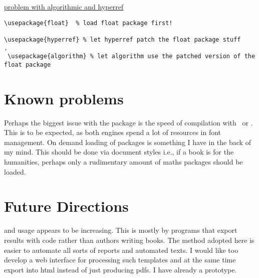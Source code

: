  
 \href{http://tex.stackexchange.com/questions/96350/problem-with-algorithmic-and-hyperref}{problem with algorithmic and hyperref}

 \begin{verbatim}
\usepackage{float}  % load float package first!

\usepackage{hyperref} % let hyperref patch the float package stuff
.
 \usepackage{algorithm} % let algorithm use the patched version of the float package
 \end{verbatim}
 

\section{Known problems}

Perhaps the biggest issue with the package is the speed of
compilation with \XeLaTeX\ or \LuaTeX. This is to be expected, as both engines spend a lot of resources in font management. On demand loading of packages is something I have in the back of my mind. This should be done via document styles i.e., if a book is for the humanities, perhaps only a rudimentary amount of maths packages should be loaded.

\section{Future Directions}

\latexe and \tex usage appears to be increasing. This is mostly by programs that export results with \latexe code rather than authors writing books.  The method adopted here is easier to automate all sorts of reports and automated texts. I would like too develop a web interface for processing such templates and at the same time export into html instead of just producing pdfs. I have already a prototype.   

%










